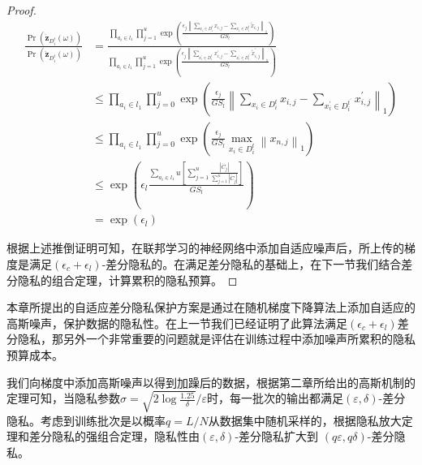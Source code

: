\begin{proof}
\begin{equation}
\begin{aligned}
\frac{\operatorname{Pr}\left(\ddot{\mathbf{z}}_{D_{i}^{t}}(\omega)\right)}{\operatorname{Pr}\left(\ddot{\mathbf{z}}_{D_{i}^{t}}(\omega)\right)} &=\frac{\prod_{a_{i} \in l_{1}} \prod_{j=1}^{u} \exp \left(\frac{\epsilon_{j}\left\|\sum_{x_{i} \in D_{i}^{t}} x_{i, j}-\sum_{x_{i} \in D_{i}^{t}} \tilde{x}_{i, j}\right\|_{1}}{G S_{l}}\right)}{\prod_{a_{i} \in l_{1}} \prod_{j=1}^{u} \exp \left(\frac{\epsilon_{j}\left\|\sum_{x_{i}^{\prime} \in D_{i}^{t^{\prime}}} x_{i, j}^{\prime}-\sum_{x_{i}^{\prime} \in D_{i}^{t^{\prime}}} \tilde{x}_{i, j}^{\prime}\right\|_{1}}{G S_{l}}\right)} \\
& \leq \prod_{a_{i} \in l_{1}} \prod_{j=0}^{u} \exp \left(\frac{\epsilon_{j}}{G S_{l}}\left\|\sum_{x_{i} \in D_{i}^{t}} x_{i, j}-\sum_{x_{i}^{\prime} \in D_{i}^{t^{\prime}}} x_{i, j}^{\prime}\right\|_{1}\right) \\
& \leq \prod_{a_{i} \in l_{1}} \prod_{j=0}^{u} \exp \left(\frac{\epsilon_{j}}{G S_{l}} \max _{x_{i} \in D_{i}^{t}}\left\|x_{n, j}\right\|_{1}\right) \\
& \leq \exp \left(\epsilon_{l} \frac{\sum_{a_{i} \in l_{1}} u\left[\sum_{j=1}^{u} \frac{\left|\ddot{C}_{j}\right|}{\sum_{j=1}^{u}\left|\ddot{C}_{j}\right|}\right]}{G S_{l}}\right) \\
&=\exp \left(\epsilon_{l}\right)
\end{aligned}
\end{equation}

根据上述推倒证明可知，在联邦学习的神经网络中添加自适应噪声后，所上传的梯度是满足$\left(\epsilon_{c}+\epsilon_{l}\right)$-差分隐私的。在满足差分隐私的基础上，在下一节我们结合差分隐私的组合定理，计算累积的隐私预算。
\end{proof}

本章所提出的自适应差分隐私保护方案是通过在随机梯度下降算法上添加自适应的高斯噪声，保护数据的隐私性。在上一节我们已经证明了此算法满足$\left(\epsilon_{c}+\epsilon_{l}\right)$差分隐私，那另外一个非常重要的问题就是评估在训练过程中添加噪声所累积的隐私预算成本。

我们向梯度中添加高斯噪声以得到加躁后的数据，根据第二章所给出的高斯机制的定理可知，当隐私参数$\sigma=\sqrt{2 \log \frac{1.25}{\delta}} / \varepsilon$时，每一批次的输出都满足$(\varepsilon, \delta)$-差分隐私。考虑到训练批次是以概率$q=L / N$从数据集中随机采样的，根据隐私放大定理和差分隐私的强组合定理，隐私性由$(\varepsilon, \delta)$-差分隐私扩大到 $(q \varepsilon, q \delta)$-差分隐私。

